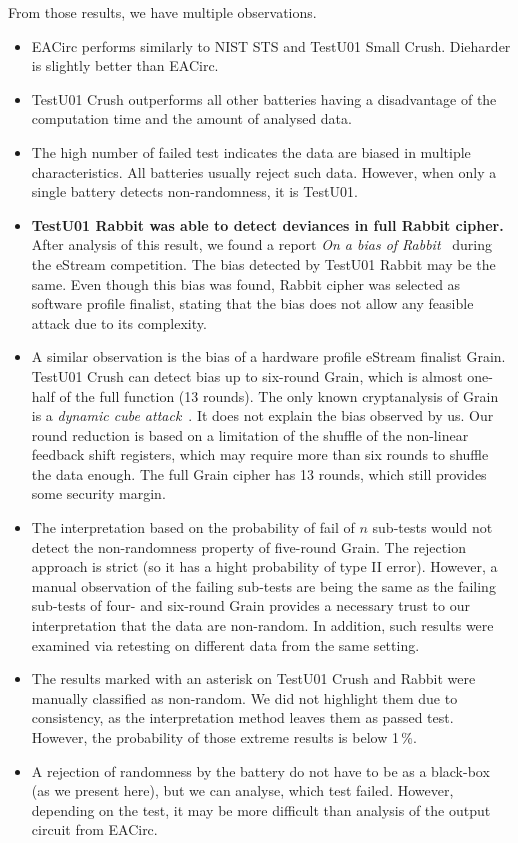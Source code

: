 \documentclass[
    digital,    %
    oneside,    %
    color,
    11pt,
    nocover,
    notable,
    nolof,
    nolot,
]{fithesis3}
\begin{document}
From those results, we have multiple observations.

\begin{itemize}
    \item EACirc performs similarly to NIST STS and TestU01 Small Crush. Dieharder is slightly better than EACirc.
    \item TestU01 Crush outperforms all other batteries having a disadvantage of the computation time and the amount of analysed data.
    \item The high number of failed test indicates the data are biased in multiple characteristics. All batteries usually reject such data. However, when only a single battery detects non-randomness, it is TestU01.
    \item \textbf{TestU01 Rabbit was able to detect deviances in full Rabbit cipher.} After analysis of this result, we found a report \textit{On a bias of Rabbit}~\cite{aumasson2007bias} during the eStream competition. The bias detected by TestU01 Rabbit may be the same. Even though this bias was found, Rabbit cipher was selected as software profile finalist, stating that the bias does not allow any feasible attack due to its complexity.
    \item A similar observation is the bias of a hardware profile eStream finalist Grain. TestU01 Crush can detect bias up to six-round Grain, which is almost one-half of the full function (13 rounds). The only known cryptanalysis of Grain is a \textit{dynamic cube attack}~\cite{dinur2011breaking}. It does not explain the bias observed by us. Our round reduction is based on a limitation of the shuffle of the non-linear feedback shift registers, which may require more than six rounds to shuffle the data enough. The full Grain cipher has 13 rounds, which still provides some security margin.
    \item The interpretation based on the probability of fail of $n$ sub-tests would not detect the non-randomness property of five-round Grain. The rejection approach is strict (so it has a hight probability of type II error). However, a manual observation of the failing sub-tests are being the same as the failing sub-tests of four- and six-round Grain provides a necessary trust to our interpretation that the data are non-random. In addition, such results were examined via retesting on different data from the same setting.
    \item The results marked with an asterisk on TestU01 Crush and Rabbit were manually classified as non-random. We did not highlight them due to consistency, as the interpretation method leaves them as passed test. However, the probability of those extreme results is below 1\,\%.
    \item A rejection of randomness by the battery do not have to be as a black-box (as we present here), but we can analyse, which test failed. However, depending on the test, it may be more difficult than analysis of the output circuit from EACirc.


\end{itemize}
\end{document}
